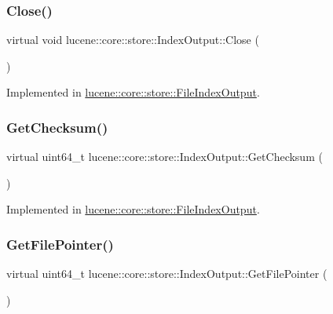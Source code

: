 \subsubsection{\texorpdfstring{Close()}{Close()}}
{\footnotesize\ttfamily virtual void lucene\+::core\+::store\+::\+Index\+Output\+::\+Close (\begin{DoxyParamCaption}{ }\end{DoxyParamCaption})\hspace{0.3cm}{\ttfamily [pure virtual]}}



Implemented in \mbox{\hyperlink{classlucene_1_1core_1_1store_1_1FileIndexOutput_ae07d09f8fa61109e46f069a138f8560b}{lucene\+::core\+::store\+::\+File\+Index\+Output}}.

\mbox{\label{classlucene_1_1core_1_1store_1_1IndexOutput_aed96af5e2bc906a72b428aa132e5b2a5}} 
\subsubsection{\texorpdfstring{Get\+Checksum()}{GetChecksum()}}
{\footnotesize\ttfamily virtual uint64\+\_\+t lucene\+::core\+::store\+::\+Index\+Output\+::\+Get\+Checksum (\begin{DoxyParamCaption}{ }\end{DoxyParamCaption})\hspace{0.3cm}{\ttfamily [pure virtual]}}



Implemented in \mbox{\hyperlink{classlucene_1_1core_1_1store_1_1FileIndexOutput_a4821aaf7a274e515eac0a3877de046fb}{lucene\+::core\+::store\+::\+File\+Index\+Output}}.

\mbox{\label{classlucene_1_1core_1_1store_1_1IndexOutput_a79bc74422633022d9ed6d088ad6d4ea2}} 
\subsubsection{\texorpdfstring{Get\+File\+Pointer()}{GetFilePointer()}}
{\footnotesize\ttfamily virtual uint64\+\_\+t lucene\+::core\+::store\+::\+Index\+Output\+::\+Get\+File\+Pointer (\begin{DoxyParamCaption}{ }\end{DoxyParamCaption})\hspace{0.3cm}{\ttfamily [pure virtual]}}



